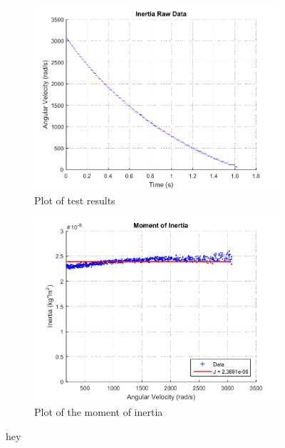 \begin{figure}[H]
  \setcounter{subfigure}{0}
  \centering
  \begin{subfigure}{0.45\textwidth}
    \centering
    \includegraphics[width=1.1\linewidth]{figures/inertiaRawData.pdf}
    \caption{Plot of test results}
    \label{momentOfInertia}
  \end{subfigure}
  \begin{subfigure}{0.45\textwidth}
    \centering
    \includegraphics[width=1.1\linewidth]{figures/momentOfInertia.pdf}
    \caption{Plot of the moment of inertia}
  	\label{inertiaRawData}
  \end{subfigure}
  \caption{hey}
  \label{yo}
\end{figure}

